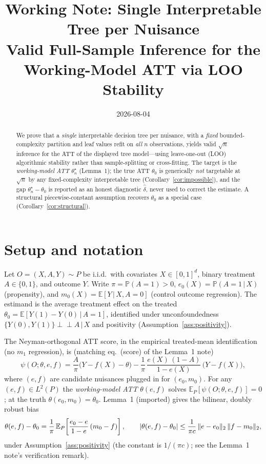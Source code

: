 \documentclass[11pt]{article}
\title{Working Note: Single Interpretable Tree per Nuisance \\
  Valid Full-Sample Inference for the Working-Model ATT via LOO Stability}
\author{}
\date{2026-08-04}
\theoremstyle{plain}
\theoremstyle{definition}
\theoremstyle{remark}
\newcommand{\E}{\mathbb{E}}
\newcommand{\PP}{\mathbb{P}}
\newcommand{\indep}{\perp\!\!\!\perp}
\newcommand{\given}{\,\vert\,}
\newcommand{\ez}{e_0}
\newcommand{\mz}{m_0}
\newcommand{\Ltwo}[1]{\lVert #1 \rVert_{2}}
\DeclarePairedDelimiter{\abs}{\lvert}{\rvert}
\newcommand{\thstar}{\theta^{\star}_n}
\newcommand{\psiscore}{\psi}
\begin{document}
\maketitle

\begin{abstract}
We prove that a \emph{single} interpretable decision tree per nuisance, with a
\emph{fixed} bounded-complexity partition and leaf values refit on \emph{all} $n$
observations, yields valid $\sqrt{n}$ inference for the ATT of the displayed tree
model---using leave-one-out (LOO) algorithmic stability
\citep{ChenSyrgkanisAustern2022} rather than sample-splitting or cross-fitting.
The target is the \emph{working-model ATT} $\thstar$ (Lemma~1); the true ATT
$\theta_0$ is generically \emph{not} targetable at $\sqrt{n}$ by any
fixed-complexity interpretable tree (Corollary~\ref{cor:impossible}), and the
gap $\thstar-\theta_0$ is reported as an honest diagnostic $\hat\delta$, never
used to correct the estimate. A structural piecewise-constant assumption
recovers $\theta_0$ as a special case (Corollary~\ref{cor:structural}).
\end{abstract}

\section{Setup and notation}\label{sec:setup}

Let $O=(X,A,Y)\sim P$ be i.i.d.\ with covariates $X\in[0,1]^d$, binary
treatment $A\in\{0,1\}$, and outcome $Y$. Write $\pi=\PP(A=1)>0$,
$\ez(X)=\PP(A=1\given X)$ (propensity), and $\mz(X)=\E[Y\given X,A=0]$ (control
outcome regression). The estimand is the average treatment effect on the treated
$\theta_0=\E[Y(1)-Y(0)\given A=1]$, identified under unconfoundedness
$\{Y(0),Y(1)\}\indep A\given X$ and positivity (Assumption~\ref{ass:positivity}).

The Neyman-orthogonal ATT score, in the empirical treated-mean identification
(no $m_1$ regression), is (matching eq.~(score) of the Lemma~1 note)
\begin{equation}\label{eq:score}
  \psiscore(O;\theta,e,f)
  = \frac{A}{\pi}\bigl(Y-f(X)-\theta\bigr)
    - \frac{1}{\pi}\,\frac{e(X)\,(1-A)}{1-e(X)}\,\bigl(Y-f(X)\bigr),
\end{equation}
where $(e,f)$ are candidate nuisances plugged in for $(\ez,\mz)$. For any
$(e,f)\in L^2(P)$ the \emph{working-model ATT} $\theta(e,f)$ solves
$\E_P[\psiscore(O;\theta,e,f)]=0$; at the truth $\theta(\ez,\mz)=\theta_0$.
Lemma~1 (imported) gives the bilinear, doubly robust bias
\begin{equation}\label{eq:lemma1}
  \theta(e,f)-\theta_0
  = \frac{1}{\pi}\,\E_P\!\left[\frac{\ez-e}{1-e}\,(\mz-f)\right],
  \qquad
  \abs{\theta(e,f)-\theta_0}\le \frac{1}{\pi c}\,\Ltwo{e-\ez}\,\Ltwo{f-\mz},
\end{equation}
under Assumption~\ref{ass:positivity} (the constant is $1/(\pi c)$; see the
Lemma~1 note's verification remark).
\end{document}
